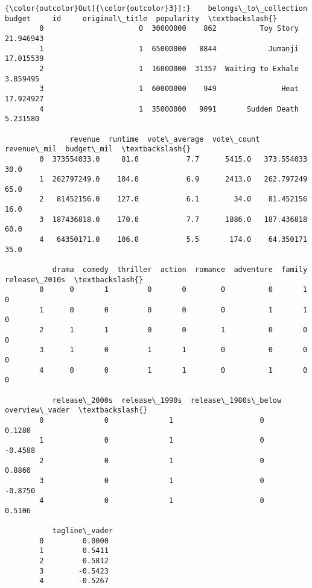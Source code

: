 \documentclass[11pt]{article}
\begin{document}
\begin{Verbatim}[commandchars=\\\{\}]
{\color{outcolor}Out[{\color{outcolor}3}]:}    belongs\_to\_collection    budget     id     original\_title  popularity  \textbackslash{}
        0                      0  30000000    862          Toy Story   21.946943   
        1                      1  65000000   8844            Jumanji   17.015539   
        2                      1  16000000  31357  Waiting to Exhale    3.859495   
        3                      1  60000000    949               Heat   17.924927   
        4                      1  35000000   9091       Sudden Death    5.231580   
        
               revenue  runtime  vote\_average  vote\_count  revenue\_mil  budget\_mil  \textbackslash{}
        0  373554033.0     81.0           7.7      5415.0   373.554033        30.0   
        1  262797249.0    104.0           6.9      2413.0   262.797249        65.0   
        2   81452156.0    127.0           6.1        34.0    81.452156        16.0   
        3  187436818.0    170.0           7.7      1886.0   187.436818        60.0   
        4   64350171.0    106.0           5.5       174.0    64.350171        35.0   
        
           drama  comedy  thriller  action  romance  adventure  family  release\_2010s  \textbackslash{}
        0      0       1         0       0        0          0       1              0   
        1      0       0         0       0        0          1       1              0   
        2      1       1         0       0        1          0       0              0   
        3      1       0         1       1        0          0       0              0   
        4      0       0         1       1        0          1       0              0   
        
           release\_2000s  release\_1990s  release\_1980s\_below  overview\_vader  \textbackslash{}
        0              0              1                    0          0.1280   
        1              0              1                    0         -0.4588   
        2              0              1                    0          0.8860   
        3              0              1                    0         -0.8750   
        4              0              1                    0          0.5106   
        
           tagline\_vader  
        0         0.0000  
        1         0.5411  
        2         0.5812  
        3        -0.5423  
        4        -0.5267  
\end{Verbatim}
            
\end{document}
